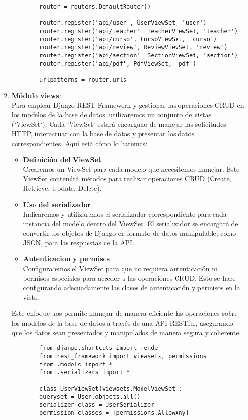 \begin{enumerate}
\begin{verbatim}
		router = routers.DefaultRouter()
		
		router.register('api/user', UserViewSet, 'user')
		router.register('api/teacher', TeacherViewSet, 'teacher')
		router.register('api/curso', CursoViewSet, 'curso')
		router.register('api/review', ReviewViewSet, 'review')
		router.register('api/section', SectionViewSet, 'section')
		router.register('api/pdf', PdfViewSet, 'pdf')
		
		urlpatterns = router.urls	
	\end{verbatim}
	\item \textbf{Módulo views}: \\
	Para emplear Django REST Framework y gestionar las operaciones CRUD en los modelos de la base de datos, utilizaremos un conjunto de vistas (`ViewSet`). Cada `ViewSet` estará encargado de manejar las solicitudes HTTP, interactuar con la base de datos y presentar los datos correspondientes. Aquí está cómo lo haremos:
	
	\begin{itemize}
		\item \textbf{Definición del ViewSet} \\
		Crearemos un ViewSet para cada modelo que necesitemos manejar. Este ViewSet contendrá métodos para realizar operaciones CRUD (Create, Retrieve, Update, Delete).
		\item \textbf{Uso del serializador}\\
		Indicaremos y utilizaremos el serializador correspondiente para cada instancia del modelo dentro del ViewSet. El serializador se encargará de convertir los objetos de Django en formato de datos manipulable, como JSON, para las respuestas de la API.
		\item \textbf{Autenticacion y permisos} \\
		Configuraremos el ViewSet para que no requiera autenticación ni permisos especiales para acceder a las operaciones CRUD. Esto se hace configurando adecuadamente las clases de autenticación y permisos en la vista.	
	\end{itemize}
	Este enfoque nos permite manejar de manera eficiente las operaciones sobre los modelos de la base de datos a través de una API RESTful, asegurando que los datos sean presentados y manipulados de manera segura y coherente.
	\begin{verbatim}
		from django.shortcuts import render
		from rest_framework import viewsets, permissions
		from .models import *
		from .serializers import *
		
		class UserViewSet(viewsets.ModelViewSet):
		queryset = User.objects.all()
		serializer_class = UserSerializer
		permission_classes = [permissions.AllowAny]
		

\end{verbatim}
\end{enumerate}
